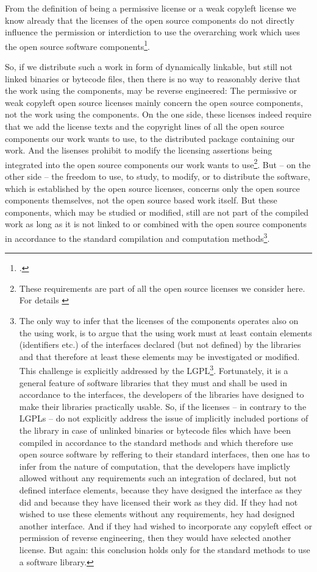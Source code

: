 From the definition of being a permissive license or a weak copyleft license we
know already that the licenses of the open source components do not directly
influence the permission or interdiction to use the overarching work which uses
the open source software components\footcite[cf.][20ff.]{Reincke2015a}.

So, if we distribute such a work in form of dynamically linkable, but still not
linked binaries or bytecode files, then there is no way to reasonably derive
that the work using the components, may be reverse engineered: The permissive or
weak copyleft open source licenses mainly concern the open source components,
not the work using the components. On the one side, these licenses indeed
require that we add the license texts and the copyright lines of all the open
source components our work wants to use, to the distributed package containing
our work. And the lisenses prohibit to modify the licensing assertions being
integrated into the open source components our work wants to use\footnote{These
requirements are part of all the open source licenses we consider here. For
details \cite[cf.][chapter 6.]{Reincke2015a}}. But -- on the other side -- the
freedom to use, to study, to modify, or to distribute the software, which is
established by the open source licenses, concerns only the open source
components themselves, not the open source based work itself. But these
components, which may be studied or modified, still are not part of the compiled
work as long as it is not linked to or combined with the open source components
in accordance to the standard compilation and computation methods\footnote{The
only way to infer that the licenses of the components operates also on the using
work, is to argue that the using work must at least contain elements
(identifiers etc.) of the interfaces declared (but not defined) by the libraries
and that therefore at least these elements may be investigated or modified. This
challenge is explicitly addressed by the LGPL\footnote{$\rightarrow$ p.
\pageref{RevEngDistributeDynamicallyLinkedCode}}. Fortunately, it is a general
feature of software libraries that they must and shall be used in accordance to
the interfaces, the developers of the libraries have designed to make their
libraries practically usable. So, if the licenses -- in contrary to the LGPLs --
do not explicitly address the issue of implicitly included portions of the
library in case of unlinked binaries or bytecode files which have been compiled
in accordance to the standard methods and which therefore use open source
software by reffering to their standard interfaces, then one has to infer from
the nature of computation, that the developers have implictly allowed without
any requirements such an integration of declared, but not defined interface
elements, because they have designed the interface as they did and because they
have licensed their work as they did. If they had not wished to use these
elements without any requirements, hey had designed another interface. And if
they had wished to incorporate any copyleft effect or permission of reverse
engineering, then they would have selected another license. But again: this
conclusion holds only for the standard methods to use a software library.}.

